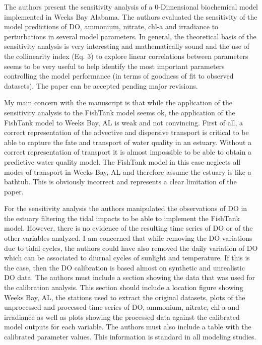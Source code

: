 \documentclass[letterpaper,12pt]{article}\usepackage[]{graphicx}\usepackage[]{color}
\begin{document}
The authors present the sensitivity analysis of a 0-Dimensional biochemical model implemented in Weeks Bay Alabama. The authors evaluated the sensitivity of the model predictions of DO, ammonium, nitrate, chl-a and irradiance to perturbations in several model parameters. In general, the theoretical basis of the sensitivity analysis is very interesting and mathematically sound and the use of the collinearity index (Eq. 3) to explore linear correlations between parameters seems to be very useful to help identify the most important parameters controlling the model performance (in terms of goodness of fit to observed datasets). The paper can be accepted pending major revisions. 

My main concern with the manuscript is that while the application of the sensitivity analysis to the FishTank model seems ok, the application of the FishTank model to Weeks Bay, AL is weak and not convincing. First of all, a correct representation of the advective and dispersive transport is critical to be able to capture the fate and transport of water quality in an estuary. Without a correct representation of transport it is almost impossible to be able to obtain a predictive water quality model. The FishTank model in this case neglects all modes of transport in Weeks Bay, AL and therefore assume the estuary is like a bathtub. This is obviously incorrect and represents a clear limitation of the paper.

For the sensitivity analysis the authors manipulated the observations of DO in the estuary filtering the tidal impacts to be able to implement the FishTank model. However, there is no evidence of the resulting time series of DO or of the other variables analyzed. I am concerned that while removing the DO variations due to tidal cycles, the authors could have also removed the daily variation of DO which can be associated to diurnal cycles of sunlight and temperature. If this is the case, then the DO calibration is based almost on synthetic and unrealistic DO data. The authors must include a section showing the data that was used for the calibration analysis. This section should include a location figure showing Weeks Bay, AL, the stations used to extract the original datasets, plots of the unprocessed and processed time series of DO, ammonium, nitrate, chl-a and irradiance as well as plots showing the processed data against the calibrated model outputs for each variable. The authors must also include a table with the calibrated parameter values. This information is standard in all modeling studies.
\end{document}
